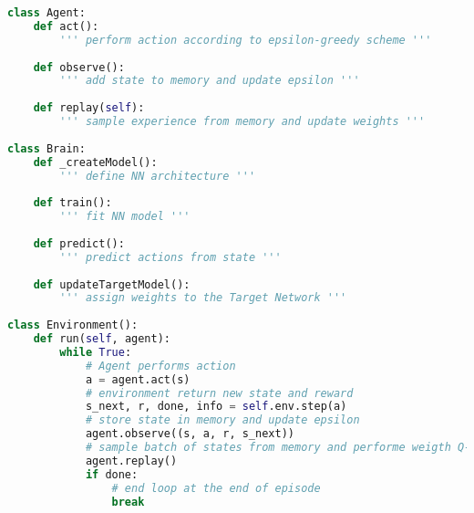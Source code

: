 \documentclass[a4paper, 11pt]{article}
\begin{document}
\begin{lstlisting}[language=Python, caption=DQN algorithm framework, label={lst:DQN}]
class Agent:
    def act():
        ''' perform action according to epsilon-greedy scheme '''
    
    def observe():
        ''' add state to memory and update epsilon '''
    
    def replay(self):
        ''' sample experience from memory and update weights '''
        
class Brain:      
    def _createModel():
        ''' define NN architecture '''
    
    def train():
        ''' fit NN model '''
    
    def predict():
        ''' predict actions from state '''
    
    def updateTargetModel():
        ''' assign weights to the Target Network '''
    
class Environment():      
    def run(self, agent):     
        while True:
            # Agent performs action
            a = agent.act(s)
            # environment return new state and reward
            s_next, r, done, info = self.env.step(a)
            # store state in memory and update epsilon
            agent.observe((s, a, r, s_next))
            # sample batch of states from memory and performe weigth Q-learning 
            agent.replay()
            if done:
            	# end loop at the end of episode
                break
\end{lstlisting}
\end{document}
